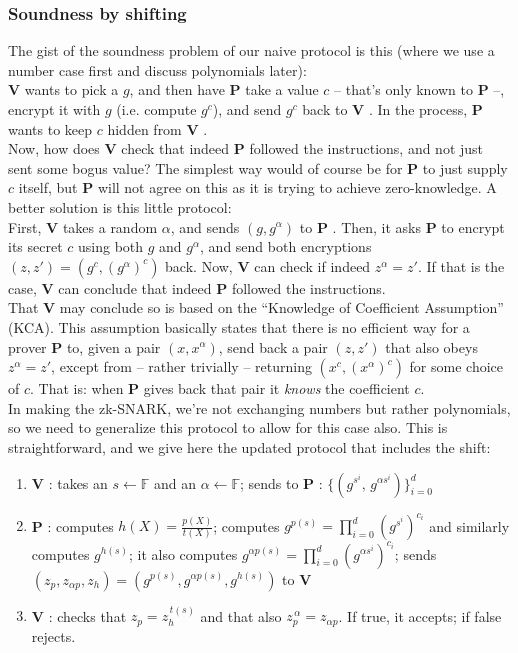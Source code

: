 \documentclass[11pt,oneside]{article}
\newcommand{\bP}{\textbf{P} }
\newcommand{\bV}{\textbf{V} }
\theoremstyle{definition}
\theoremstyle{remark}
\numberwithin{equation}{section}
\begin{document}
\subsubsection{Soundness by shifting}

The gist of the soundness problem of our naive protocol is this (where we use a
number case first and discuss polynomials later):\\ \indent \bV wants to pick a
$g$, and then have \bP take a value $c$ -- that's only known to \bP --, encrypt
it with $g$ (i.e. compute $g^c$), and send $g^c$ back to \bV\!\!. In the
process, \bP wants to keep $c$ hidden from \bV\!\!.\\ Now, how does \bV check
that indeed \bP followed the instructions, and not just sent some bogus value?
The simplest way would of course be for \bP to just supply $c$ itself, but \bP
will not agree on this as it is trying to achieve zero-knowledge. A better
solution is this little protocol:\\ First, \bV takes a random $\alpha$, and
sends $(g,g^\alpha)$ to \bP. Then, it asks \bP to encrypt its secret $c$ using
both $g$ and $g^\alpha$, and send both encryptions
$(z,z')=(g^c,\left(g^{\alpha}\right)^c)$ back. Now, \bV can check if indeed
$z^\alpha=z'$. If that is the case, \bV can conclude that indeed \bP followed
the instructions.\\ That \bV may conclude so is based on the ``Knowledge of
Coefficient Assumption'' (KCA). This assumption basically states that there is
no efficient way for a prover \bP to, given a pair $(x,x^\alpha)$, send back a
pair $(z,z')$ that also obeys $z^\alpha=z'$, except from -- rather trivially --
returning $(x^c,\left(x^\alpha\right)^c)$ for some choice of $c$. That is: when
\bP gives back that pair it \emph{knows} the coefficient $c$.\\ \newline In
making the zk-SNARK, we're not exchanging numbers but rather polynomials, so we
need to generalize this protocol to allow for this case also. This is
straightforward, and we give here the updated protocol that includes the shift:
\begin{enumerate}
  \item \bV: takes an $s\leftarrow\mathbb{F}$ and an
    $\alpha\leftarrow\mathbb{F}$; sends to \bP: $\{(g^{s^i}\!,\, g^{\alpha
    s^i})\}_{i=0}^{d}$
  \item  \bP: computes $h(X)=\frac{p(X)}{t(X)}$; computes
    $g^{p(s)}=\prod\limits_{i=0}^d\left(g^{s^i}\right)^{c_i}$ and similarly
    computes $g^{h(s)}$; it also computes $g^{\alpha
    p(s)}=\prod\limits_{i=0}^d\left(g^{\alpha s^i}\right)^{c_i}$; sends
    $(z_p,z_{\alpha p},z_h)=(g^{p(s)},g^{\alpha p(s)},g^{h(s)})$ to \bV
  \item \bV: checks that $z_p=z_h^{\,t(s)}$ and that also
    $z_p^{\,\alpha}=z_{\alpha p}$. If true, it accepts; if false rejects.
\end{enumerate}
\end{document}
